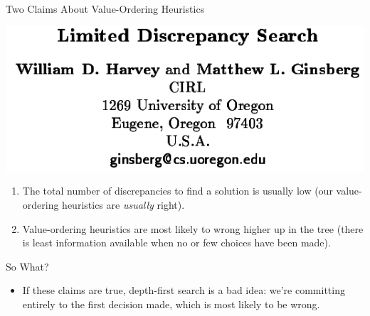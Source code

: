 \documentclass{beamer}
\begin{document}
\begin{frame}{Two Claims About Value-Ordering Heuristics}

    \centering
    \includegraphics[keepaspectratio=true,scale=0.3]{lds-paper.png}
    \vspace{1em}

    \begin{enumerate}
        \item The total number of discrepancies to find a solution is usually low (our
            value-ordering heuristics are \emph{usually} right).
        \item Value-ordering heuristics are most likely to wrong higher up in the tree (there is
            least information available when no or few choices have been made).
    \end{enumerate}
\end{frame}

\begin{frame}{So What?}
    \begin{itemize}
        \item If these claims are true, depth-first search is a bad idea: we're committing entirely
            to the first decision made, which is most likely to be wrong.
    \end{itemize}
\end{frame}
\end{document}
